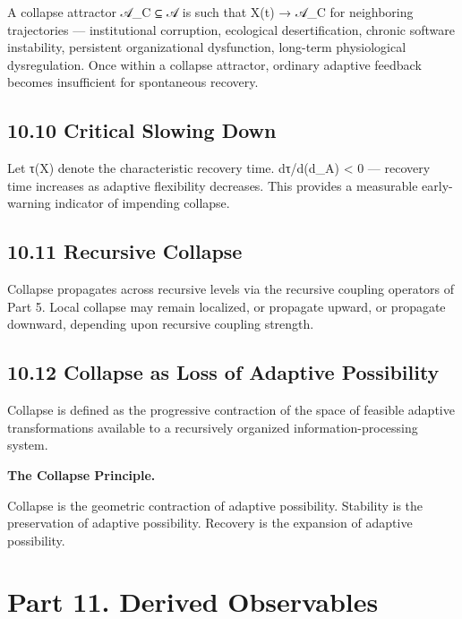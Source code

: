 \documentclass[
]{article}
\begin{document}
A collapse attractor 𝒜\_C ⊆ 𝒜 is such that X(t) → 𝒜\_C for neighboring
trajectories --- institutional corruption, ecological desertification,
chronic software instability, persistent organizational dysfunction,
long-term physiological dysregulation. Once within a collapse attractor,
ordinary adaptive feedback becomes insufficient for spontaneous
recovery.

\hypertarget{critical-slowing-down}{%
\subsection{10.10 Critical Slowing Down}\label{critical-slowing-down}}

Let τ(X) denote the characteristic recovery time. dτ/d(d\_A) \textless{}
0 --- recovery time increases as adaptive flexibility decreases. This
provides a measurable early-warning indicator of impending collapse.

\hypertarget{recursive-collapse}{%
\subsection{10.11 Recursive Collapse}\label{recursive-collapse}}

Collapse propagates across recursive levels via the recursive coupling
operators of Part 5. Local collapse may remain localized, or propagate
upward, or propagate downward, depending upon recursive coupling
strength.

\hypertarget{collapse-as-loss-of-adaptive-possibility}{%
\subsection{10.12 Collapse as Loss of Adaptive
Possibility}\label{collapse-as-loss-of-adaptive-possibility}}

Collapse is defined as the progressive contraction of the space of
feasible adaptive transformations available to a recursively organized
information-processing system.

\textbf{The Collapse Principle.}

Collapse is the geometric contraction of adaptive possibility. Stability
is the preservation of adaptive possibility. Recovery is the expansion
of adaptive possibility.

\hypertarget{part-11.-derived-observables}{%
\section{Part 11. Derived
Observables}\label{part-11.-derived-observables}}
\end{document}
